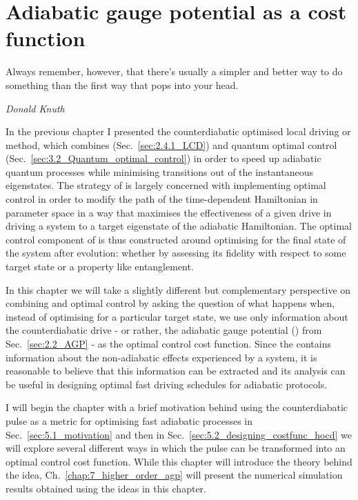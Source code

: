 \chapter{Adiabatic gauge potential as a cost function}\label{chap:5_cd_as_costfunc}

\epigraph{Always remember, however, that there’s usually a simpler and better way to do something than the first way that pops into your head.}{\emph{Donald Knuth}}

In the previous chapter I presented the counterdiabatic optimised local driving or  method, which combines  (Sec.~\ref{sec:2.4.1_LCD}) and quantum optimal control (Sec.~\ref{sec:3.2_Quantum_optimal_control}) in order to speed up adiabatic quantum processes while minimising transitions out of the instantaneous eigenstates. The strategy of  is largely concerned with implementing optimal control in order to modify the path of the time-dependent Hamiltonian in parameter space in a way that maximises the effectiveness of a given  drive in driving a system to a target eigenstate of the adiabatic Hamiltonian. The optimal control component of  is thus constructed around optimising for the final state of the system after evolution: whether by assessing its fidelity with respect to some target state or a property like entanglement.

In this chapter we will take a slightly different but complementary perspective on combining  and optimal control by asking the question of what happens when, instead of optimising for a particular target state, we use only information about the counterdiabatic drive - or rather, the adiabatic gauge potential () from Sec.~\ref{sec:2.2_AGP} - as the optimal control cost function. Since the  contains information about the non-adiabatic effects experienced by a system, it is reasonable to believe that this information can be extracted and its analysis can be useful in designing optimal fast driving schedules for adiabatic protocols. 

I will begin the chapter with a brief motivation behind using the counterdiabatic pulse as a metric for optimising fast adiabatic processes in Sec.~\ref{sec:5.1_motivation} and then in Sec.~\ref{sec:5.2_designing_costfunc_hocd} we will explore several different ways in which the  pulse can be transformed into an optimal control cost function. While this chapter will introduce the theory behind the idea, Ch.~\ref{chap:7_higher_order_agp} will present the numerical simulation results obtained using the ideas in this chapter.

